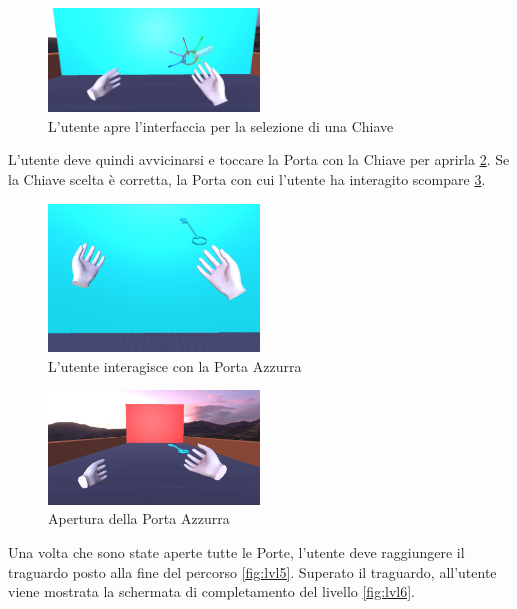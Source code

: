 \documentclass[target=bach,aauheader=]{thud}
\begin{document}
\begin{figure}[h]
    \centering
    \includegraphics[width=0.50\textwidth]{lvl2}
    \caption{L'utente apre l'interfaccia per la selezione di una Chiave }
    \label{fig:lvl2}
\end{figure}

L'utente deve quindi avvicinarsi e toccare la Porta con la Chiave per aprirla \ref{fig:lvl3}.
Se la Chiave scelta è corretta, la Porta con cui l'utente ha interagito scompare \ref{fig:lvl4}. \\

\begin{figure}[h]
    \centering
    \includegraphics[width=0.50\textwidth]{lvl3}
    \caption{L'utente interagisce con la Porta Azzurra}
    \label{fig:lvl3}
\end{figure}

\begin{figure}[h]
    \centering
    \includegraphics[width=0.50\textwidth]{lvl4}
    \caption{Apertura della Porta Azzurra}
    \label{fig:lvl4}
\end{figure}

\newpage
Una volta che sono state aperte tutte le Porte, l'utente deve raggiungere il traguardo posto alla fine del percorso \ref{fig:lvl5}.
Superato il traguardo, all'utente viene mostrata la schermata di completamento del livello \ref{fig:lvl6}. \\
\end{document}
